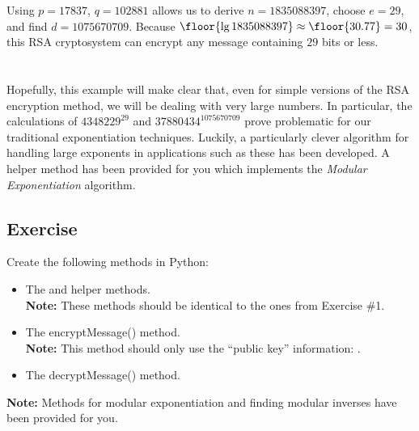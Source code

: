 			Using $p = 17837$, $q = 102881$ allows us to derive $n = 1835088397$, choose $e = 29$, and find $d = 1075670709$. Because $\floor{\lg 1835088397} \approx \floor{30.77} = 30$, this RSA cryptosystem can encrypt any message containing $29$ bits or less.\\[\baselineskip]
			\ \\[9pt]
			\ \\[\baselineskip]
			Hopefully, this example will make clear that, even for simple versions of the RSA encryption method, we will be dealing with very large numbers. In particular, the calculations of $4348229^{29}$ and $37880434^{1075670709}$ prove problematic for our traditional exponentiation techniques. Luckily, a particularly clever algorithm for handling large exponents in applications such as these has been developed. A helper method has been provided for you which implements the \emph{Modular Exponentiation} algorithm.

		\subsection{Exercise}
				Create the following methods in Python:
				\begin{itemize}
					\item The  and  helper methods.\\
					\textbf{Note:} These methods should be identical to the ones from Exercise \#1.
					\item The encryptMessage() method.\\
					\textbf{Note:} This method should only use the ``public key'' information: .
					\item The decryptMessage() method.
				\end{itemize}
				\textbf{Note:} Methods for modular exponentiation and finding modular inverses have been provided for you.

